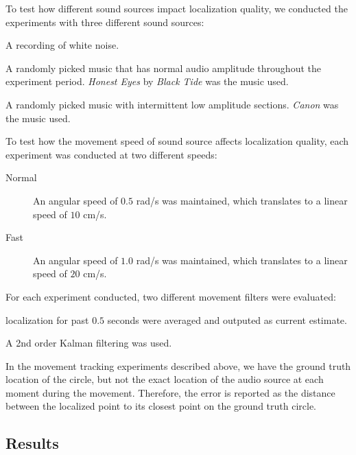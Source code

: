 To test how different sound sources impact localization quality, we conducted the experiments with three different sound sources:
\begin{description}

\item[White Noise] A recording of white noise.

\item[Music A] A randomly picked music that has normal audio amplitude throughout the experiment period. \emph{Honest Eyes} by \emph{Black Tide} was the music used.

\item[Music B] A randomly picked music with intermittent low amplitude sections. \emph{Canon} was the music used.

\end{description} 

To test how the movement speed of sound source affects localization quality, each experiment was conducted at two different speeds:
\begin{description}
\item[Normal] An angular speed of $0.5$ rad/s was maintained, which translates to a linear speed of $10$ cm/s.
\item[Fast] An angular speed of $1.0$ rad/s was maintained, which translates to a linear speed of $20$ cm/s.
\end{description}

For each experiment conducted, two different movement filters were evaluated:
\begin{description}
\item[Averaging filter] localization for past $0.5$ seconds were averaged and outputed as current estimate.
\item[Kalman filter] A 2nd order Kalman filtering was used.
\end{description}

In the movement tracking experiments described above, we have the ground truth location of the circle, but not the exact location of the audio source at each moment during the movement. Therefore, the error is reported as the distance between the localized point to its closest point on the ground truth circle.

\subsection{Results}
